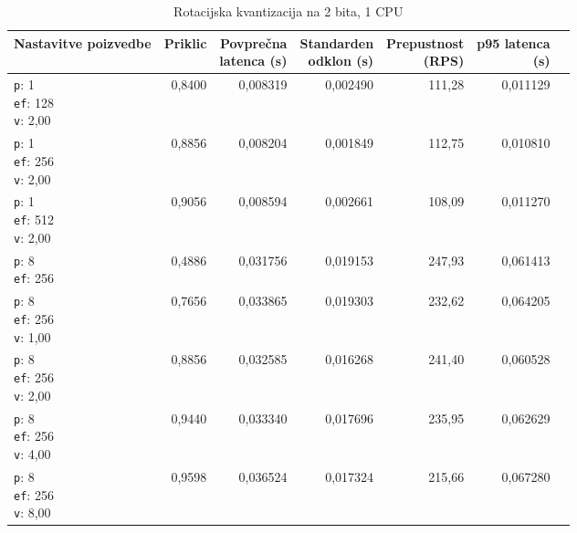 \begin{table}[htbp]
  \centering
\small
  \caption{Rotacijska kvantizacija na 2 bita, 1 CPU}
  \label{tab:single-1cpu-4ram:tq2:qdrant-dipl-baseline-tenant-subgraph-tq2-ext-m16-ef-128-random-768-100-tenants-extended-upload-2026-08-18-09-28-29.json}
  \begin{tabularx}{\textwidth}{Xrrrrrr}
    \toprule
    Nastavitve poizvedbe & Priklic & \makecell{Povprečna\\latenca (s)} & \makecell{Standarden\\odklon (s)} & \makecell{Prepustnost\\(RPS)} & \makecell{p95 latenca\\(s)}  \\
    \midrule
    \makecell{\texttt{p}: 1\\\texttt{ef}: 128\\\texttt{v}: 2,00} & 0,8400 & 0,008319 & 0,002490 & 111,28 & 0,011129 \\
    \makecell{\texttt{p}: 1\\\texttt{ef}: 256\\\texttt{v}: 2,00} & 0,8856 & 0,008204 & 0,001849 & 112,75 & 0,010810 \\
    \makecell{\texttt{p}: 1\\\texttt{ef}: 512\\\texttt{v}: 2,00} & 0,9056 & 0,008594 & 0,002661 & 108,09 & 0,011270 \\
    \makecell{\texttt{p}: 8\\\texttt{ef}: 256} & 0,4886 & 0,031756 & 0,019153 & 247,93 & 0,061413 \\
    \makecell{\texttt{p}: 8\\\texttt{ef}: 256\\\texttt{v}: 1,00} & 0,7656 & 0,033865 & 0,019303 & 232,62 & 0,064205 \\
    \makecell{\texttt{p}: 8\\\texttt{ef}: 256\\\texttt{v}: 2,00} & 0,8856 & 0,032585 & 0,016268 & 241,40 & 0,060528 \\
    \makecell{\texttt{p}: 8\\\texttt{ef}: 256\\\texttt{v}: 4,00} & 0,9440 & 0,033340 & 0,017696 & 235,95 & 0,062629 \\
    \makecell{\texttt{p}: 8\\\texttt{ef}: 256\\\texttt{v}: 8,00} & 0,9598 & 0,036524 & 0,017324 & 215,66 & 0,067280 \\

\end{tabularx}
\end{table}
